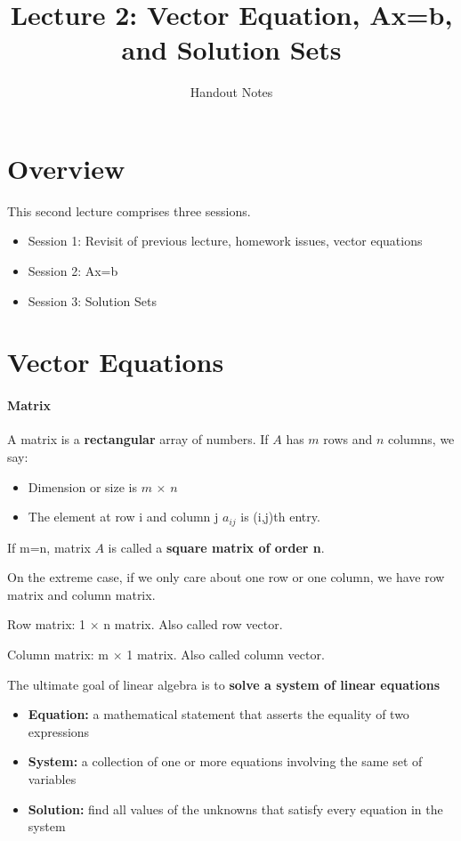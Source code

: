 \documentclass[11pt]{article}
\title{Lecture 2: Vector Equation, Ax=b, and Solution Sets}
\author{Handout Notes}
\date{}
\theoremstyle{definition}
\begin{document}
\maketitle

\section*{Overview}
This second lecture comprises three sessions.

\begin{itemize}
    \item Session 1: Revisit of previous lecture, homework issues, vector equations
    \item Session 2: Ax=b
    \item Session 3: Solution Sets
\end{itemize}

\section{Vector Equations}
\paragraph{Matrix} A matrix is a \textbf{rectangular} array of numbers. If $A$ has {\color{blue} $m$} rows and {\color{green} $n$} columns, we say:

\begin{itemize}
    \item Dimension or size is {\color{blue} $m$} $\times$ {\color{green} $n$}
    \item The element at row i and column j $a_{ij}$ is (i,j)th entry. 
\end{itemize}

If m=n, matrix $A$ is called a \textbf{square matrix of order n}. 

On the extreme case, if we only care about one row or one column, we have row matrix and column matrix.

Row matrix: 1 $\times$ n matrix. Also called row vector.



Column matrix: m $\times$ 1 matrix. Also called column vector.




The ultimate goal of linear algebra is to \textbf{solve a system of linear equations}

\begin{itemize}
    \item \textbf{Equation:} a mathematical statement that asserts the equality of two expressions
    \item \textbf{System:} a collection of one or more equations involving the same set of variables
    \item \textbf{Solution:} find all values of the unknowns that satisfy every equation in the system
\end{itemize}
\end{document}
